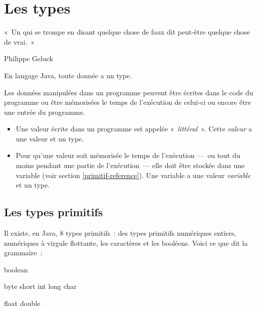 \chapter{Les types}
\label{chap:types}

\begin{Exergue}

	«~Un  qui se trompe en disant quelque chose de faux dit peut-être
	quelque chose de vrai.~»

	\begin{flushright}

		Philippe Geluck
		
	\end{flushright}

\end{Exergue}

En langage Java, toute donnée a un type. 

Les données manipulées dans un programme peuvent être écrites dans le code du
programme ou être mémorisées le temps de l'exécution de celui-ci ou encore être
une entrée du programme. 


\begin{itemize}
	\item Une valeur écrite dans un programme est appelée
		«~\textit{littéral}~». Cette \textit{valeur} a une valeur et un type. 

	\item Pour qu'une valeur soit mémorisée le temps de l'exécution —~ou tout
		du moins pendant une partie de l'exécution~— elle doit être stockée
		dans une variable (voir section \vref{primitif-reference}). Une
		variable a une valeur \textit{variable} et un type. 

\end{itemize}

\minitoc

\section{Les types primitifs}

Il existe, en Java, 8 types primitifs~: des types primitifs numériques
entiers, numériques à virgule flottante, les  caractères et les booléens.
Voici ce que dit la grammaire~: 

\begin{grammaire}
		boolean


		byte short int long char

		float double
\end{grammaire}

